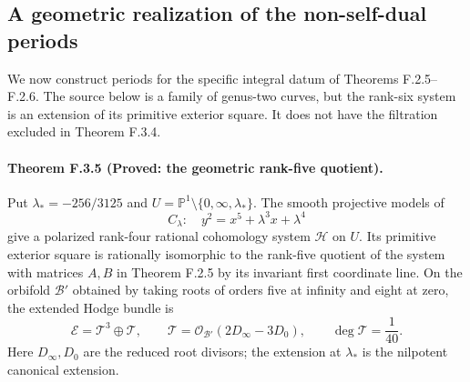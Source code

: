 \subsection{A geometric realization of the non-self-dual periods}

We now construct periods for the specific integral datum of
Theorems F.2.5--F.2.6.  The source below is a family of genus-two
curves, but the rank-six system is an extension of its primitive
exterior square.  It does not have the filtration excluded in
Theorem F.3.4.

\paragraph{Theorem F.3.5 (Proved: the geometric rank-five quotient).}
Put $\lambda_*=-256/3125$ and
$U=\mathbb P^1\setminus\{0,\infty,\lambda_*\}$.  The smooth projective
models of
\[
 C_\lambda:\quad y^2=x^5+\lambda^3x+\lambda^4
 \tag{F.7}
\]
give a polarized rank-four rational cohomology system $\mathcal H$ on
$U$.  Its primitive exterior square is rationally isomorphic to
the rank-five quotient of the system with matrices $A,B$ in
Theorem F.2.5 by its invariant first coordinate line.
On the orbifold $\mathcal B'$ obtained by taking roots of orders
five at infinity and eight at zero, the extended Hodge bundle is
\[
 \mathcal E=\mathcal T^3\oplus\mathcal T,\qquad
 \mathcal T=\mathcal O_{\mathcal B'}(2D_\infty-3D_0),\qquad
 \deg\mathcal T=\frac1{40}.
 \tag{F.8}
\]
Here $D_\infty,D_0$ are the reduced root divisors; the extension at
$\lambda_*$ is the nilpotent canonical extension.

